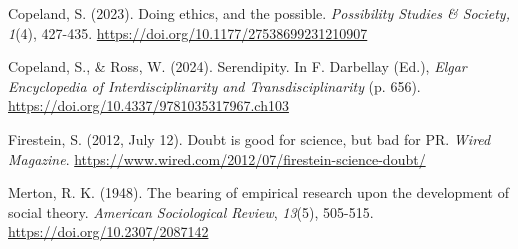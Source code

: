 \documentclass[authordate, commentary]{jote-new-article}
\begin{document}
	Copeland, S. (2023). Doing ethics, and the possible. \emph{Possibility Studies \& Society,} \emph{1}(4), 427-435. \url{https://doi.org/10.1177/27538699231210907}


	Copeland, S., \& Ross, W. (2024). Serendipity. In F. Darbellay (Ed.), \emph{Elgar Encyclopedia of Interdisciplinarity and Transdisciplinarity }(p. 656). \url{https://doi.org/10.4337/9781035317967.ch103}

	Firestein, S. (2012, July 12). Doubt is good for science, but bad for PR. \emph{Wired Magazine}. \url{https://www.wired.com/2012/07/firestein-science-doubt/}

	Merton, R. K. (1948). The bearing of empirical research upon the development of social theory. \emph{American Sociological Review}, \emph{13}(5), 505-515. \url{https://doi.org/10.2307/2087142}
\end{document}
